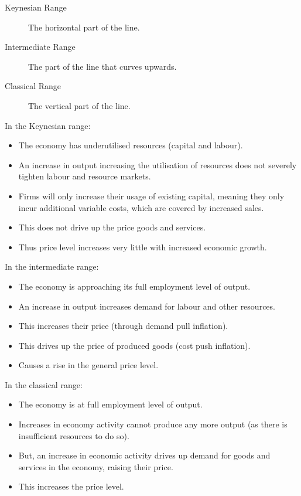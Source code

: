 \documentclass[a4paper,11pt]{report}
\begin{document}
\begin{description}
\item [Keynesian Range] The horizontal part of the line.
\item [Intermediate Range] The part of the line that curves upwards.
\item [Classical Range] The vertical part of the line.
\end{description}

In the Keynesian range:

\begin{itemize}
\item The economy has underutilised resources (capital and labour).
\item An increase in output increasing the utilisation of resources does not
	severely tighten labour and resource markets.
\item Firms will only increase their usage of existing capital, meaning they
	only incur additional variable costs, which are covered by increased sales.
\item This does not drive up the price goods and services.
\item Thus price level increases very little with increased economic growth.
\end{itemize}

In the intermediate range:

\begin{itemize}
\item The economy is approaching its full employment level of output.
\item An increase in output increases demand for labour and other resources.
\item This increases their price (through demand pull inflation).
\item This drives up the price of produced goods (cost push inflation).
\item Causes a rise in the general price level.
\end{itemize}

In the classical range:

\begin{itemize}
\item The economy is at full employment level of output.
\item Increases in economy activity cannot produce any more output (as there is
	insufficient resources to do so).
\item But, an increase in economic activity drives up demand for goods and
	services in the economy, raising their price.
\item This increases the price level.
\end{itemize}
\end{document}
